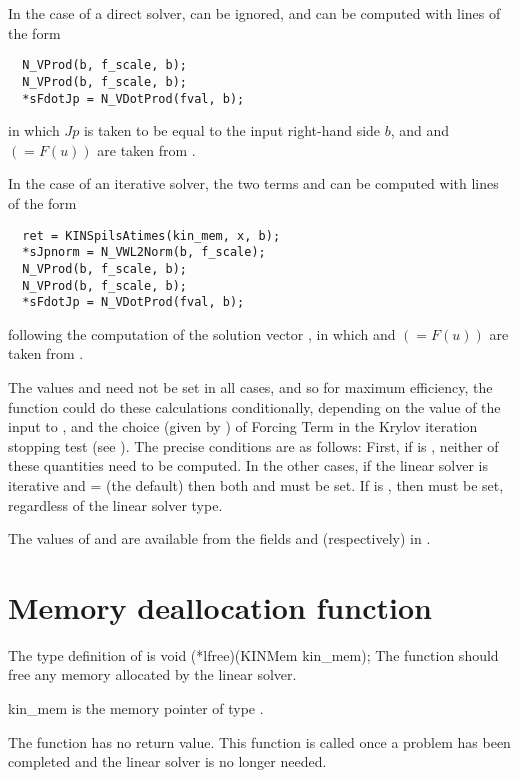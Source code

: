 In the case of a direct solver,  can be ignored, and
 can be computed with lines of the form
\vspace{-.1in}
  \begin{verbatim}
  N_VProd(b, f_scale, b);
  N_VProd(b, f_scale, b);
  *sFdotJp = N_VDotProd(fval, b);
  \end{verbatim}
\vspace{-.2in}
in which $Jp$ is taken to be equal to the input right-hand side $b$,
and  and  $(= F(u))$ are taken from .

In the case of an iterative solver, the two terms  and
 can be computed with lines of the form
\vspace{-.1in}
  \begin{verbatim}
  ret = KINSpilsAtimes(kin_mem, x, b);
  *sJpnorm = N_VWL2Norm(b, f_scale);
  N_VProd(b, f_scale, b);
  N_VProd(b, f_scale, b);
  *sFdotJp = N_VDotProd(fval, b);
  \end{verbatim}
\vspace{-.2in}
following the computation of the solution vector , in which
 and  $(= F(u))$ are taken from .

The values  and  need not be set in all cases,
and so for maximum efficiency, the  function could do these
calculations conditionally, depending on the value of the input 
to , and the choice (given by ) of Forcing Term
in the Krylov iteration stopping test (see ).
The precise conditions are as follows:  First, if  is
, neither of these quantities need to be computed.
In the other cases, if the linear solver is iterative
and  =  (the default) then both
 and  must be set.  If  is
, then  must be set, regardless of
the linear solver type.

The values of  and  are available from the fields
 and  (respectively) in .


\section{Memory deallocation function}
The type definition of  is
{
  void (*lfree)(KINMem kin\_mem);
}
{
  The  function should free any memory allocated by the linear solver.
}
{
  \begin{args}
  \item[kin\_mem]
    is the {\kinsol} memory pointer of type .
  \end{args}
}
{
  The  function has no return value.
}
{
  This function is called once a problem has been completed and the 
  linear solver is no longer needed.
}